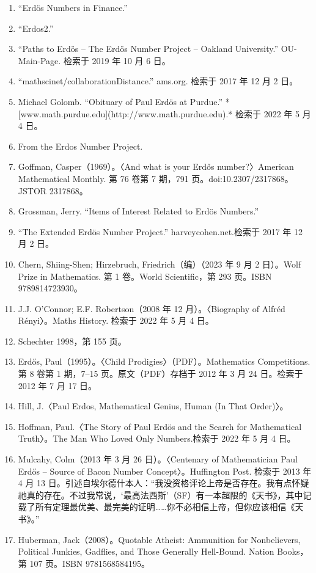 \begin{enumerate}
\item “Erdös Numbers in Finance.”
\item “Erdos2.”
\item “Paths to Erdös – The Erdös Number Project – Oakland University.” OU-Main-Page. 检索于 2019 年 10 月 6 日。
\item “mathscinet/collaborationDistance.” ams.org. 检索于 2017 年 12 月 2 日。
\item Michael Golomb. “Obituary of Paul Erdös at Purdue.” *[www.math.purdue.edu](http://www.math.purdue.edu).* 检索于 2022 年 5 月 4 日。
\item From the Erdos Number Project.
\item Goffman, Casper（1969）。〈And what is your Erdős number?〉American Mathematical Monthly. 第 76 卷第 7 期，791 页。doi:10.2307/2317868。JSTOR 2317868。
\item Grossman, Jerry. “Items of Interest Related to Erdös Numbers.”
\item “The Extended Erdös Number Project.” harveycohen.net.检索于 2017 年 12 月 2 日。
\item Chern, Shiing-Shen; Hirzebruch, Friedrich（编）（2023 年 9 月 2 日）。Wolf Prize in Mathematics. 第 1 卷。World Scientific，第 293 页。ISBN 9789814723930。
\item J.J. O’Connor; E.F. Robertson（2008 年 12 月）。〈Biography of Alfréd Rényi〉。Maths History. 检索于 2022 年 5 月 4 日。
\item Schechter 1998，第 155 页。
\item Erdős, Paul（1995）。〈Child Prodigies〉（PDF）。Mathematics Competitions. 第 8 卷第 1 期，7–15 页。原文（PDF）存档于 2012 年 3 月 24 日。检索于 2012 年 7 月 17 日。
\item Hill, J.〈Paul Erdos, Mathematical Genius, Human (In That Order)〉。
\item Hoffman, Paul.〈The Story of Paul Erdös and the Search for Mathematical Truth〉。The Man Who Loved Only Numbers.检索于 2022 年 5 月 4 日。
\item Mulcahy, Colm（2013 年 3 月 26 日）。〈Centenary of Mathematician Paul Erdős – Source of Bacon Number Concept〉。Huffington Post. 检索于 2013 年 4 月 13 日。引述自埃尔德什本人：“我没资格评论上帝是否存在。我有点怀疑祂真的存在。不过我常说，‘最高法西斯’（SF）有一本超限的《天书》，其中记载了所有定理最优美、最完美的证明……你不必相信上帝，但你应该相信《天书》。”
\item Huberman, Jack（2008）。Quotable Atheist: Ammunition for Nonbelievers, Political Junkies, Gadflies, and Those Generally Hell-Bound. Nation Books，第 107 页。ISBN 9781568584195。

\end{enumerate}
